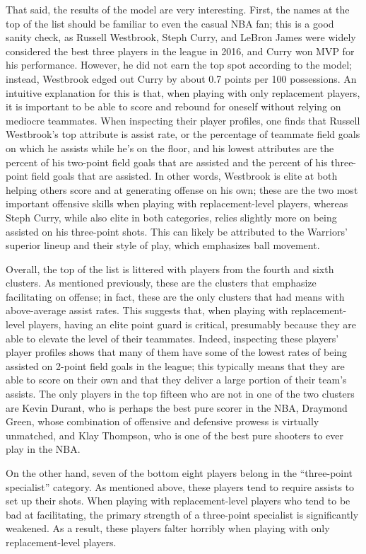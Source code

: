 That said, the results of the model are very interesting. First, the names at the
top of the list should be familiar to even the casual NBA fan; this is a good sanity
check, as Russell Westbrook, Steph Curry, and LeBron James were widely considered
the best three players in the league in 2016, and Curry won MVP for his performance.
However, he did not earn the top spot according to the model; instead, Westbrook
edged out Curry by about 0.7 points per 100 possessions. An intuitive explanation
for this is that, when playing with only replacement players, it is important to be
able to score and rebound for oneself without relying on mediocre teammates.  When
inspecting their player profiles, one finds that Russell Westbrook's top attribute
is assist rate, or the percentage of teammate field goals on which he assists while
he's on the floor, and his lowest attributes are the percent of his two-point field
goals that are assisted and the percent of his three-point field goals that are
assisted. In other words, Westbrook is elite at both helping others score and at
generating offense on his own; these are the two most important offensive skills
when playing with replacement-level players, whereas Steph Curry, while also elite
in both categories, relies slightly more on being assisted on his three-point shots.
This can likely be attributed to the Warriors' superior lineup and their style of
play, which emphasizes ball movement.

Overall, the top of the list is littered with players from the fourth and sixth
clusters. As mentioned previously, these are the clusters that emphasize
facilitating on offense; in fact, these are the only clusters that had means with
above-average assist rates. This suggests that, when playing with replacement-level
players, having an elite point guard is critical, presumably because they are able
to elevate the level of their teammates. Indeed, inspecting these players' player
profiles shows that many of them have some of the lowest rates of being assisted on
2-point field goals in the league; this typically means that they are able to score
on their own and that they deliver a large portion of their team's assists. The
only players in the top fifteen who are not in one of the two clusters are Kevin
Durant, who is perhaps the best pure scorer in the NBA, Draymond Green, whose
combination of offensive and defensive prowess is virtually unmatched, and Klay
Thompson, who is one of the best pure shooters to ever play in the NBA.

On the other hand, seven of the bottom eight players belong in the ``three-point
specialist'' category. As mentioned above, these players tend to require assists to
set up their shots. When playing with replacement-level players who tend to be bad
at facilitating, the primary strength of a three-point specialist is significantly
weakened. As a result, these players falter horribly when playing with only
replacement-level players.

